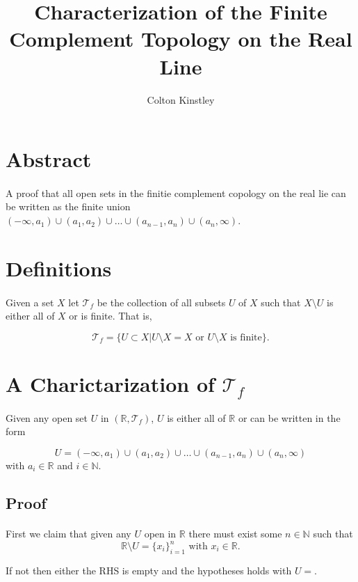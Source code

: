 \documentclass[11pt, oneside]{article}   	%
\title{Characterization of the Finite Complement Topology on the Real Line}
\author{Colton Kinstley}
\begin{document}
\maketitle



\section*{Abstract}
\paragraph{}

A proof that all open sets in the finitie complement copology on the real lie can be written as the finite union $(- \infty , a_1) \cup (a_1,a_2) \cup \dots \cup (a_{n-1}, a_n) \cup (a_n, \infty)$.


\section*{Definitions}
\paragraph{}

Given a set $X$ let $\mathscr{T}_f$ be the collection of all subsets $U$ of $X$ such that $X \setminus U$ is either all of $X$ or is finite. That is,

\[
\mathscr{T}_f = \{ U \subset X | U \setminus X = X \text{ or } U \setminus X \text{ is finite} \}.
\]




\section*{A Charictarization of $\mathscr{T}_f$}
\paragraph{}

Given any open set $U$ in $(\mathbb{R},\mathscr{T}_f)$, $U$ is either all of $\mathbb{R}$ or can be written in the form

\[
U = (- \infty , a_1) \cup (a_1,a_2) \cup \dots \cup (a_{n-1}, a_n) \cup (a_n, \infty)
\]
with $a_i \in \mathbb{R}$ and $ i \in \mathbb{N}$.

\subsection*{Proof}
\paragraph{}

First we claim that given any $U$ open in $\mathbb{R}$ there must exist some $n \in \mathbb{N}$ such that
\[
\mathbb{R} \setminus U = \{x_i\}_{i=1}^n \text{ with } x_i \in \mathbb{R}.
\]

If not then either the RHS is empty and the hypotheses holds with $U = $. 
\end{document}
